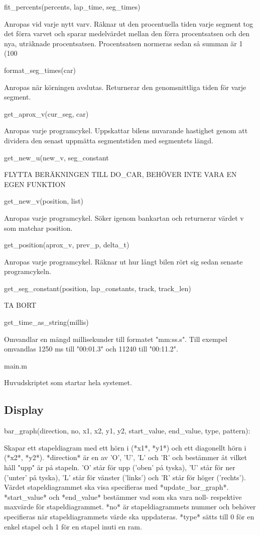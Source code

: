 \documentclass[10pt,oneside,swedish]{lips-no_customer}
\begin{document}
fit\_percents(percents, lap\_time, seg\_times)

Anropas vid varje nytt varv. Räknar ut den procentuella tiden varje segment tog
det förra varvet och sparar medelvärdet mellan den förra procentsatsen och den
nya, uträknade procentsatsen. Procentsatsen normeras sedan så summan är 1
(100%

format\_seg\_times(car)

Anropas när körningen avslutas. Returnerar den genomsnittliga tiden för varje
segment.

get\_aprox\_v(cur\_seg, car)

Anropas varje programcykel. Uppskattar bilens nuvarande hastighet genom att
dividera den senast uppmätta segmentstiden med segmentets längd.

get\_new\_u(new\_v, seg\_constant

FLYTTA BERÄKNINGEN TILL DO\_CAR, BEHÖVER INTE VARA EN EGEN FUNKTION

get\_new\_v(position, list)

Anropas varje programcykel. Söker igenom bankartan och returnerar värdet v som
matchar position.

get\_position(aprox\_v, prev\_p, delta\_t)

Anropas varje programcykel. Räknar ut hur långt bilen rört sig sedan senaste
programcykeln.

get\_seg\_constant(position, lap\_constants, track, track\_len)

TA BORT

get\_time\_as\_string(millis)

Omvandlar en mängd millisekunder till formatet "mm:ss.s". Till exempel omvandlas 1250
ms till "00:01.3" och 11240 till "00:11.2".

main.m

Huvudskriptet som startar hela systemet.

\subsection{Display}

bar\_graph(direction, no, x1, x2, y1, y2, start\_value, end\_value, type, pattern):

Skapar ett stapeldiagram med ett hörn i (*x1*, *y1*) och ett diagonellt
hörn i (*x2*, *y2*). *direction* är en av 'O', 'U', 'L' och 'R' och
bestämmer åt vilket håll "upp" är på stapeln. 'O' står för upp ('oben'
på tyska), 'U' står för ner ('unter' på tyska), 'L' står för vänster
('links') och 'R' står för höger ('rechts'). Värdet stapeldiagrammet ska
visa specifieras med *update\_bar\_graph*. *start\_value* och
*end\_value* bestämmer vad som ska vara noll- respektive maxvärde för
stapeldiagrammet. *no* är stapeldiagrammets nummer och behöver
specifieras när stapeldiagrammets värde ska uppdateras. *type* sätts
till 0 för en enkel stapel och 1 för en stapel inuti en ram.
\end{document}
